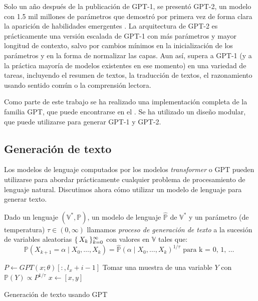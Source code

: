 Solo un año después de la publicación de GPT-1, se presentó GPT-2, un modelo con 1.5 mil millones de parámetros que demostró por primera vez de forma clara la aparición de habilidades emergentes \cite{radford2019language}. La arquitectura de GPT-2 es prácticamente una versión escalada de GPT-1 con más parámetros y mayor longitud de contexto, salvo por cambios mínimos en la inicialización de los parámetros y en la forma de normalizar las capas. Aun así, supera a GPT-1 (y a la práctica mayoría de modelos existentes en ese momento) en una variedad de tareas, incluyendo el resumen de textos, la traducción de textos, el razonamiento usando sentido común o la comprensión lectora.

Como parte de este trabajo se ha realizado una implementación completa de la familia GPT, que puede encontrarse en el . Se ha utilizado un diseño modular, que puede utilizarse para generar GPT-1 y GPT-2.

\subsection{Generación de texto} \label{sec:gen}
Los modelos de lenguaje computados por los modelos \textit{transformer} o GPT pueden utilizarse para abordar prácticamente cualquier problema de procesamiento de lenguaje natural. Discutimos ahora cómo utilizar un modelo de lenguaje para generar texto. 

\begin{definition}
    Dado un lenguaje \( (\mathbb{V}^*, \mathbb{P}) \), un modelo de lenguaje \( \widehat{\mathbb{P}} \) de \( \mathbb{V^*} \) y un parámetro (de temperatura) \( \tau \in (0, \infty) \) llamamos \textit{proceso de generación de texto} a la sucesión de variables aleatorias  \( \{\,X_k\,\}_{k = 0}^\infty \) con valores en \( \mathbb{V} \) tales que:
    \begin{equation} \label{eq:generation}
        \mathbb{P}(X_{k + 1} = \alpha \mid X_{0}, …, X_{k}) = \widehat{\mathbb{P}} \left( \alpha \mid  X_0, …, X_k \right)^{1/\tau} \text{ para k = 0, 1, … }
    \end{equation}
\end{definition}

\begin{algorithm}[tb]
    \SetAlgoLined
  
     {
      $P \gets GPT(x; \theta)[:, l_x + i - 1]$ \;
      Tomar una muestra de una variable $Y$ con $\mathbb{P}(Y) \propto P^{1 / \tau}$ \;
      $x \gets [x, y]$ \;
    }
  
    \caption{Generación de texto usando GPT \cite{phuong2022formal}}
    \label{algo:gpt_inference}
  \end{algorithm}
  

